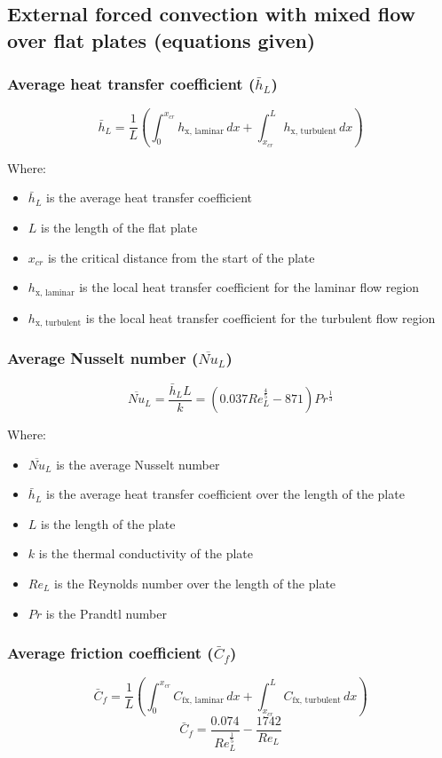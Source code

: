 \documentclass[11pt]{article}
\begin{document}
\subsection{External forced convection with mixed flow over flat plates (equations given)}
\label{sec:orgc3b2488}

\subsubsection{Average heat transfer coefficient (\(\bar{h}_L\))}
\label{sec:orgb20e37d}
\[\bar{h}_L = \frac{1}{L} \left(\int_0^{x_{cr}} h_{\text{x, laminar}} \, dx + \int_{x_{cr}}^L h_{\text{x, turbulent}} \, dx \right)\]

Where:
\begin{itemize}
\item \(\bar{h}_L\) is the average heat transfer coefficient
\item \(L\) is the length of the flat plate
\item \(x_{cr}\) is the critical distance from the start of the plate
\item \(h_{\text{x, laminar}}\) is the local heat transfer coefficient for the laminar flow region
\item \(h_{\text{x, turbulent}}\) is the local heat transfer coefficient for the turbulent flow region
\end{itemize}

\subsubsection{Average Nusselt number (\(\overline{Nu}_L\))}
\label{sec:orga530941}
\[\overline{Nu}_L = \frac{\bar{h}_L L}{k} = (0.037 Re_L^ \frac{4}{5} - 871) Pr^{\frac{1}{3}}\]

Where:
\begin{itemize}
\item \(\overline{Nu}_L\) is the average Nusselt number
\item \(\bar{h}_L\) is the average heat transfer coefficient over the length of the plate
\item \(L\) is the length of the plate
\item \(k\) is the thermal conductivity of the plate
\item \(Re_L\) is the Reynolds number over the length of the plate
\item \(Pr\) is the Prandtl number
\end{itemize}

\subsubsection{Average friction coefficient (\(\bar{C}_f\))}
\label{sec:orgc01c109}
\[\bar{C}_f = \frac{1}{L} \left(\int_0^{x_{cr}} C_{\text{fx, laminar}} \, dx + \int_{x_{cr}}^L C_{\text{fx, turbulent}} \, dx \right)\]
\[\bar{C}_f = \frac{0.074}{Re_L^{\frac{1}{5}}} - \frac{1742}{Re_L}\]
\end{document}
